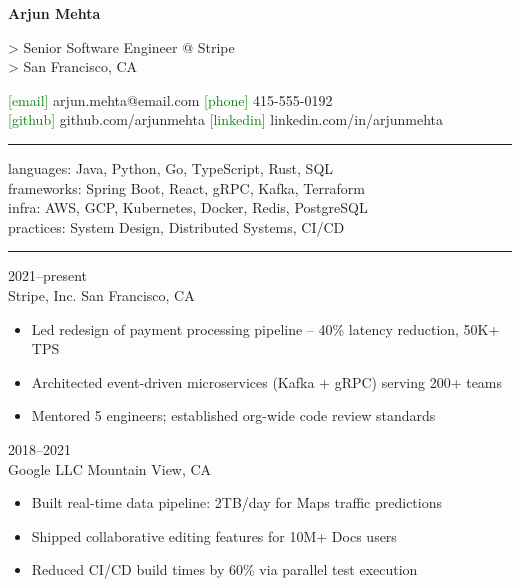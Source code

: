 \documentclass[10pt,letterpaper]{article}
\newcommand{\devheader}[1]{%
  \vspace{10pt}\noindent{\ttfamily\large\bfseries\color{blue} \#\# #1}\vspace{4pt}\par%
  \noindent\textcolor{border}{\rule{\textwidth}{0.5pt}}\vspace{4pt}\par%
}
\begin{document}
{\ttfamily\fontsize{22}{26}\selectfont\bfseries Arjun Mehta}
\vspace{2pt}

{\ttfamily\small\color{dimgray}
> Senior Software Engineer @ Stripe \\
> San Francisco, CA
}

\vspace{6pt}
{\ttfamily\small
\textcolor{green}{[email]} arjun.mehta@email.com \quad
\textcolor{green}{[phone]} 415-555-0192 \\
\textcolor{green}{[github]} github.com/arjunmehta \quad
\textcolor{green}{[linkedin]} linkedin.com/in/arjunmehta
}

\devheader{tech\_stack}

\begin{mdframed}[style=codeblock]
{\ttfamily\small
languages: \enspace Java, Python, Go, TypeScript, Rust, SQL \\
frameworks: Spring Boot, React, gRPC, Kafka, Terraform \\
infra: \enspace\enspace\enspace\enspace AWS, GCP, Kubernetes, Docker, Redis, PostgreSQL \\
practices: \enspace System Design, Distributed Systems, CI/CD
}
\end{mdframed}

\devheader{experience}

 \hfill {\ttfamily\small\color{dimgray} 2021--present}\\
{\small\color{blue} Stripe, Inc.} \hfill {\small San Francisco, CA}
\begin{itemize}[leftmargin=1.2em, label={\textcolor{green}{\textbullet}}, topsep=2pt, itemsep=1pt]
  \item Led redesign of payment processing pipeline -- 40\% latency reduction, 50K+ TPS
  \item Architected event-driven microservices (Kafka + gRPC) serving 200+ teams
  \item Mentored 5 engineers; established org-wide code review standards
\end{itemize}

\vspace{6pt}
 \hfill {\ttfamily\small\color{dimgray} 2018--2021}\\
{\small\color{blue} Google LLC} \hfill {\small Mountain View, CA}
\begin{itemize}[leftmargin=1.2em, label={\textcolor{green}{\textbullet}}, topsep=2pt, itemsep=1pt]
  \item Built real-time data pipeline: 2TB/day for Maps traffic predictions
  \item Shipped collaborative editing features for 10M+ Docs users
  \item Reduced CI/CD build times by 60\% via parallel test execution
\end{itemize}
\end{document}
